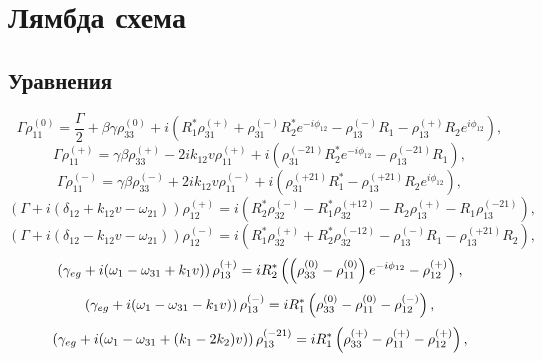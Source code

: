 \chapter{Лямбда схема}\label{ch:ch1}

\section{Уравнения}\label{sec:ch1/sec1}

\begin{equation}
    \Gamma\rho_{11}^{(0)}=\frac{\Gamma}{2}+\beta\gamma\rho_{33}^{(0)}+i\left( R_1^{*}\rho_{31}^{(+)}+\rho_{31}^{(-)}R_2^{*}e^{-i\phi_{12}} - \rho_{13}^{(-)}R_1-\rho_{13}^{(+)}R_2e^{i\phi_{12}} \right),
\end{equation}
\begin{equation}
    \Gamma\rho_{11}^{(+)} = \gamma\beta\rho_{33}^{(+)}-2ik_{12}v\rho_{11}^{(+)}+i\left( \rho_{31}^{(-21)}R_2^{*}e^{-i\phi_{12}}-\rho_{13}^{(-21)}R_1 \right),
\end{equation}
\begin{equation}
    \Gamma\rho_{11}^{(-)} = \gamma\beta\rho_{33}^{(-)}+2ik_{12}v\rho_{11}^{(-)}+i\left( \rho_{31}^{(+21)}R_1^{*}-\rho_{13}^{(+21)}R_2e^{i\phi_{12}} \right),
\end{equation}
\begin{equation}
    \left(\Gamma+i(\delta_{12}+k_{12}v-\omega_{21})\right)\rho_{12}^{(+)}=i\left( R_2^{*}\rho_{32}^{(-)}-R_1^{*}\rho_{32}^{(+12)}-R_2\rho_{13}^{(+)}-R_1\rho_{13}^{(-21)} \right),
\end{equation}
\begin{equation}
    \left(\Gamma+i(\delta_{12}-k_{12}v-\omega_{21})\right)\rho_{12}^{(-)}=i\left( R_1^*\rho_{32}^{(+)}+R_2^*\rho_{32}^{(-12)}-\rho_{13}^{(-)}R_1-\rho_{13}^{(+21)}R_2 \right),
\end{equation}
\begin{equation}
    \left( \gamma_{eg}+i(\omega_1-\omega_{31}+k_1v) \right)\rho^{(+)}_{13}=iR_2^*\left(\left(\rho^{(0)}_{33}-\rho^{(0)}_{11}\right)e^{-i\phi_{12}}-\rho^{(+)}_{12}\right),
\end{equation}
\begin{equation}
    \left(\gamma_{eg}+i(\omega_1-\omega_{31}-k_1v)\right)\rho^{(-)}_{13}=iR_1^*\left(\rho^{(0)}_{33}-\rho^{(0)}_{11}-\rho^{(-)}_{12}\right),
\end{equation}
\begin{equation}
    \left(\gamma_{eg}+i(\omega_1-\omega_{31}+(k_1-2k_2)v)\right)\rho^{(-21)}_{13}=iR_1^*\left(\rho^{(+)}_{33}-\rho^{(+)}_{11}-\rho^{(+)}_{12}\right),
\end{equation}
